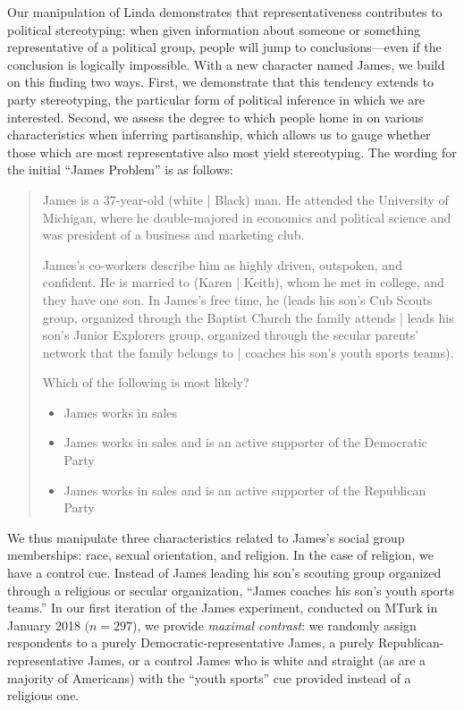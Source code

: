 \documentclass[12pt, letterpaper]{article}
\begin{document}
Our manipulation of Linda demonstrates that representativeness contributes to political stereotyping: when given information about someone or something representative of a political group, people will jump to conclusions---even if the conclusion is logically impossible. With a new character named James, we build on this finding two ways. First, we demonstrate that this tendency extends to party stereotyping, the particular form of political inference in which we are interested. Second, we assess the degree to which people home in on various characteristics when inferring partisanship, which allows us to gauge whether those which are most representative also most yield stereotyping. The wording for the initial ``James Problem'' is as follows:
\begin{quotation}
\noindent James is a 37-year-old (white | Black) man. He attended the University of Michigan, where he double-majored in economics and political science and was president of a business and marketing club. 
\vspace{0.1in}

\noindent James's co-workers describe him as highly driven, outspoken, and confident. He is married to (Karen | Keith), whom he met in college, and they have one son. In James's free time, he (leads his son's Cub Scouts group, organized through the Baptist Church the family attends | leads his son's Junior Explorers group, organized through the secular parents' network that the family belongs to | coaches his son's youth sports teams).
\vspace{0.1in}

\noindent Which of the following is most likely?
\begin{itemize}
\item James works in sales
\item James works in sales and is an active supporter of the Democratic Party
\item James works in sales and is an active supporter of the Republican Party
\end{itemize}
\end{quotation}

We thus manipulate three characteristics related to James's social group memberships: race, sexual orientation, and religion. In the case of religion, we have a control cue. Instead of James leading his son's scouting group organized through a religious or secular organization, ``James coaches his son's youth sports teams.'' In our first iteration of the James experiment, conducted on MTurk in January 2018 $(n=297$), we provide \emph{maximal contrast}: we randomly assign respondents to a purely Democratic-representative James, a purely Republican-representative James, or a control James who is white and straight (as are a majority of Americans) with the ``youth sports'' cue provided instead of a religious one. 
\end{document}
